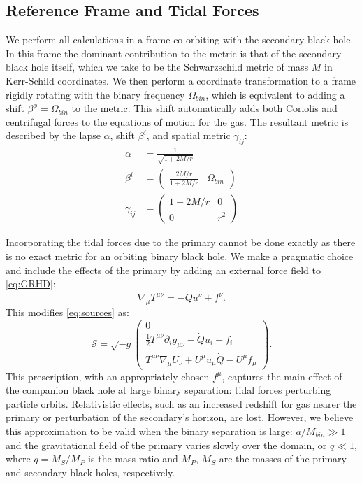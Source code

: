 \documentclass{emulateapj}
\newcommand{\al}{\alpha}
\newcommand{\be}{\beta}
\newcommand{\gam}{\gamma}
\newcommand{\Om}{\Omega}
\newcommand{\pd}{\partial}
\begin{document}
\subsection{Reference Frame and Tidal Forces}
\label{subsec:frameforces}

We perform all calculations in a frame co-orbiting with the secondary black hole.  In this frame the dominant contribution to the metric is that of the secondary black hole itself, which we take to be the Schwarzschild metric of mass $M$ in Kerr-Schild coordinates.  We then perform a coordinate transformation to a frame rigidly rotating with the binary frequency $\Om_{bin}$, which is equivalent to adding a shift $\be^\phi = \Om_{bin}$ to the metric.  This shift automatically adds both Coriolis and centrifugal forces to the equations of motion for the gas.  The resultant metric is described by the lapse $\al$, shift $\be^i$, and spatial metric $\gam_{ij}$:
\begin{align}
	\al &= \frac{1}{\sqrt{1+2M/r}} \\
	\be^i &= \begin{pmatrix} \frac{2M/r}{1+2M/r} & \Om_{bin} \end{pmatrix} \\
	\gam_{ij} &= \begin{pmatrix} 1+2M/r & 0 \\ 0 & r^2 \end{pmatrix}
\end{align}

Incorporating the tidal forces due to the primary cannot be done exactly as there is no exact metric for an orbiting binary black hole.  We make a pragmatic choice and include the effects of the primary by adding an external force field to \eqref{eq:GRHD}:
\begin{equation}
	\nabla_\mu T^{\mu\nu} = -\dot{Q} u^\nu + f^\nu . 
\end{equation}
This modifies \eqref{eq:sources} as:
\begin{equation}
	\mathcal{S} = \sqrt{-g} \begin{pmatrix} 0 \\
                        \frac{1}{2}T^{\mu\nu}\pd_i g_{\mu\nu} - \dot{Q}u_i  + f_i \\
                        T^{\mu\nu}\nabla_\mu U_\nu + U^\mu u_\mu \dot{Q} - U^\mu f_\mu \end{pmatrix} .\label{eq:sourcesF}
\end{equation}
This prescription, with an appropriately chosen $f^\mu$, captures the main effect of the companion black hole at large binary separation: tidal forces perturbing particle orbits.  Relativistic effects, such as an increased redshift for gas nearer the primary or perturbation of the secondary's horizon, are lost. However, we believe this approximation to be valid when the binary separation is large: $a/M_{bin} \gg 1$ and the gravitational field of the primary varies slowly over the domain, or $q \ll 1$, where $q = M_S / M_P$ is the mass ratio and $M_P$, $M_S$ are the masses of the primary and secondary black holes, respectively.
\end{document}
